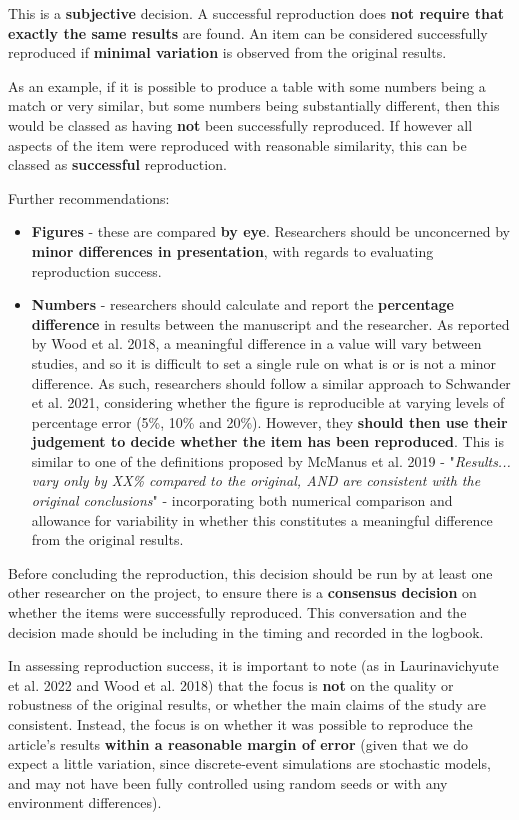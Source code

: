 This is a \textbf{subjective} decision. A successful reproduction does \textbf{not require that exactly the same results} are found. An item can be considered successfully reproduced if \textbf{minimal variation} is observed from the original results.

As an example, if it is possible to produce a table with some numbers being a match or very similar, but some numbers being substantially different, then this would be classed as having \textbf{not} been successfully reproduced. If however all aspects of the item were reproduced with reasonable similarity, this can be classed as \textbf{successful} reproduction.

Further recommendations:
\begin{itemize}
    \item \textbf{Figures} - these are compared \textbf{by eye}. Researchers should be unconcerned by \textbf{minor differences in presentation}, with regards to evaluating reproduction success.
    \item \textbf{Numbers} - researchers should calculate and report the \textbf{percentage difference} in results between the manuscript and the researcher. As reported by Wood et al. 2018,\autocite{wood_push_2018, wood_replication_2018} a meaningful difference in a value will vary between studies, and so it is difficult to set a single rule on what is or is not a minor difference. As such, researchers should follow a similar approach to Schwander et al. 2021,\autocite{schwander_replication_2021} considering whether the figure is reproducible at varying levels of percentage error (5\%, 10\% and 20\%). However, they \textbf{should then use their judgement to decide whether the item has been reproduced}. This is similar to one of the definitions proposed by McManus et al. 2019\autocite{mcmanus_can_2019} - "\textit{Results... vary only by XX\% compared to the original, AND are consistent with the original conclusions}" - incorporating both numerical comparison and allowance for variability in whether this constitutes a meaningful difference from the original results.
\end{itemize}

Before concluding the reproduction, this decision should be run by at least one other researcher on the project, to ensure there is a \textbf{consensus decision} on whether the items were successfully reproduced. This conversation and the decision made should be including in the timing and recorded in the logbook.

In assessing reproduction success, it is important to note (as in Laurinavichyute et al. 2022\autocite{laurinavichyute_share_2022} and Wood et al. 2018\autocite{wood_push_2018}) that the focus is \textbf{not} on the quality or robustness of the original results, or whether the main claims of the study are consistent. Instead, the focus is on whether it was possible to reproduce the article's results \textbf{within a reasonable margin of error} (given that we do expect a little variation, since discrete-event simulations are stochastic models, and may not have been fully controlled using random seeds or with any environment differences).

